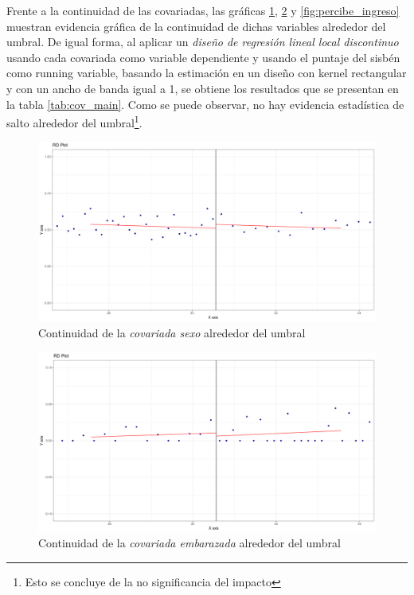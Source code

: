 \documentclass[AER]{AEA}
\begin{document}
Frente a la continuidad de las covariadas, las gráficas \ref{fig:sexo}, \ref{fig:embarazada} y \ref{fig:percibe_ingreso} muestran evidencia gráfica de la continuidad de dichas variables alrededor del umbral. De igual forma, al aplicar un \textit{diseño de regresión lineal local discontinuo} usando cada covariada como variable dependiente y usando el puntaje del sisbén como running variable, basando la estimación en un diseño con kernel rectangular y con un ancho de banda igual a 1, se obtiene los resultados que se presentan en la tabla \ref{tab:cov_main}. Como se puede observar, no hay evidencia estadística de salto alrededor del umbral\footnote{Esto se concluye de la no significancia del impacto}. 

\begin{figure}[h]
    \centering
    \includegraphics[scale = 0.35]{imagenes/estimax_principal/sexo_main.png}
    \caption{Continuidad de la \textit{covariada sexo} alrededor del umbral}
    \label{fig:sexo}
\end{figure}

\begin{figure}[h]
    \centering
    \includegraphics[scale = 0.35]{imagenes/estimax_principal/embarzada_main.png}
    \caption{Continuidad de la \textit{covariada embarazada} alrededor del umbral}
    \label{fig:embarazada}
\end{figure}
\end{document}
